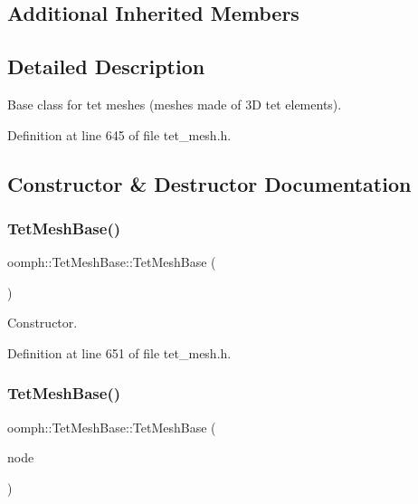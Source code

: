\subsection*{Additional Inherited Members}


\subsection{Detailed Description}
Base class for tet meshes (meshes made of 3D tet elements). 

Definition at line 645 of file tet\+\_\+mesh.\+h.



\subsection{Constructor \& Destructor Documentation}
\mbox{\label{classoomph_1_1TetMeshBase_abf0883a1f6964480ddabf5867b3b2a55}} 
\subsubsection{\texorpdfstring{Tet\+Mesh\+Base()}{TetMeshBase()}\hspace{0.1cm}{\footnotesize\ttfamily [1/2]}}
{\footnotesize\ttfamily oomph\+::\+Tet\+Mesh\+Base\+::\+Tet\+Mesh\+Base (\begin{DoxyParamCaption}{ }\end{DoxyParamCaption})\hspace{0.3cm}{\ttfamily [inline]}}



Constructor. 



Definition at line 651 of file tet\+\_\+mesh.\+h.

\mbox{\label{classoomph_1_1TetMeshBase_af324e7f2cc2f1ae8efd510786331684f}} 
\subsubsection{\texorpdfstring{Tet\+Mesh\+Base()}{TetMeshBase()}\hspace{0.1cm}{\footnotesize\ttfamily [2/2]}}
{\footnotesize\ttfamily oomph\+::\+Tet\+Mesh\+Base\+::\+Tet\+Mesh\+Base (\begin{DoxyParamCaption}\item[{const \hyperlink{classoomph_1_1TetMeshBase}{Tet\+Mesh\+Base} \&}]{node }\end{DoxyParamCaption})\hspace{0.3cm}{\ttfamily [inline]}}



